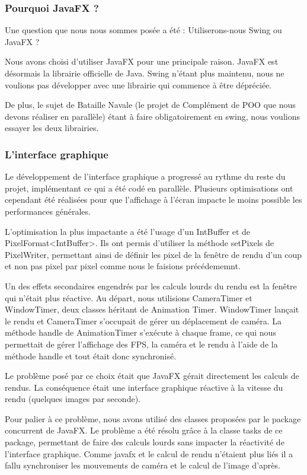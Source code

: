 \subsubsection{Pourquoi JavaFX ?}

Une question que nous nous sommes posée a été : Utiliserons-nous Swing ou JavaFX ?

Nous avons choisi d'utiliser JavaFX pour une principale raison. JavaFX est désormais la librairie officielle de Java. Swing n'étant plus maintenu, nous ne voulions pas développer avec une librairie qui commence à être dépréciée.

De plus, le sujet de Bataille Navale (le projet de Complément de POO que nous devons réaliser en parallèle) étant à faire obligatoirement en swing, nous voulions essayer les deux librairies.


\subsubsection{L'interface graphique}

Le développement de l'interface graphique a progressé au rythme du reste du projet, implémentant ce qui a été codé en parallèle. Plusieurs optimisations ont cependant été réalisées pour que l'affichage à l'écran impacte le moins possible les performances générales.

L'optimisation la plus impactante a été l'usage d'un IntBuffer et de PixelFormat<IntBuffer>. Ils ont permis d'utiliser la méthode setPixels de PixelWriter, permettant ainsi de définir les pixel de la fenêtre de rendu d'un coup et non pas pixel par pixel comme nous le faisions précédememnt.

Un des effets secondaires engendrés par les calculs lourds du rendu est la fenêtre qui n'était plus réactive.
Au départ, nous utilisions CameraTimer et WindowTimer, deux classes héritant de Animation Timer. WindowTimer lançait le rendu et CameraTimer s'occupait de gérer un déplacement de caméra. La méthode handle de AnimationTimer s'exécute à chaque frame, ce qui nous permettait de gérer l'affichage des FPS, la caméra et le rendu à l'aide de la méthode handle et tout était donc synchronisé.

Le problème posé par ce choix était que JavaFX gérait directement les calculs de rendus. La conséquence était une interface graphique réactive à la vitesse du rendu (quelques images par seconde).

\label{UsageTask}

Pour palier à ce problème, nous avons utilisé des classes proposées par le package concurrent de JavaFX. Le problème a été résolu grâce à la classe tasks de ce package, permettant de faire des calculs lourds sans impacter la réactivité de l'interface graphique. Comme javafx et le calcul de rendu n'étaient plus liés il a fallu synchroniser les mouvements de caméra et le calcul de l'image d'après.

